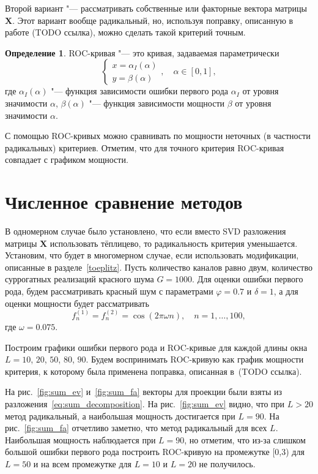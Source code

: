 \documentclass[specialist,
substylefile = spbu_report.rtx,
subf,href,colorlinks=true, 12pt]{disser}
\newcommand{\traj}{\mathbf{X}}
\theoremstyle{definition}
\newtheorem{definition}{Определение}
\begin{document}
	Второй вариант "--- рассматривать собственные или факторные вектора матрицы $\traj$. Этот вариант вообще радикальный, но, используя поправку, описанную в работе (TODO ссылка), можно сделать такой критерий точным.
	
	\begin{definition}
		ROC-кривая "--- это кривая, задаваемая параметрически
		\[
		\begin{cases}
		x=\alpha_I(\alpha)\\
		y=\beta(\alpha)
		\end{cases},\quad \alpha\in[0,1],
		\]
		где $\alpha_I(\alpha)$ "--- функция зависимости ошибки первого рода $\alpha_I$ от уровня значимости $\alpha$, $\beta(\alpha)$ "--- функция зависимости мощности $\beta$ от уровня значимости $\alpha$.
	\end{definition}
	С помощью ROC-кривых можно сравнивать по мощности неточных (в частности радикальных) критериев. Отметим, что для точного критерия ROC-кривая совпадает с графиком мощности.
	\section{Численное сравнение методов}
	В одномерном случае было установлено, что если вместо SVD разложения матрицы $\traj$ использовать тёплицево, то радикальность критерия уменьшается. Установим, что будет в многомерном случае, если использовать модификации, описанные в разделе~\ref{toeplitz}.
	Пусть количество каналов равно двум, количество суррогатных реализаций красного шума $G=1000$. Для оценки ошибки первого рода, будем рассматривать красный шум с параметрами $\varphi=0.7$ и $\delta=1$, а для оценки мощности будет рассматривать
	\[
	f_n^{(1)}=f_n^{(2)}=\cos(2\pi\omega n),\quad n=1,\ldots, 100,
	\]
	где $\omega=0.075$.
	
	Построим графики ошибки первого рода и ROC-кривые для каждой длины окна $L=10$, $20$, $50$, $80$, $90$. Будем воспринимать ROC-кривую как график мощности критерия, к которому была применена поправка, описанная в~(TODO ссылка). 
	
	На рис.~\ref{fig:sum_ev} и~\ref{fig:sum_fa} векторы для проекции были взяты из разложения~\eqref{eq:sum_decomposition}. На рис.~\ref{fig:sum_ev} видно, что при $L>20$ метод радикальный, а наибольшая мощность достигается при $L=90$. На рис.~\ref{fig:sum_fa} отчетливо заметно, что метод радикальный для всех $L$. Наибольшая мощность наблюдается при $L=90$, но отметим, что из-за слишком большой ошибки первого рода построить ROC-кривую на промежутке [0,3) для $L=50$ и на всем промежутке для $L=10$ и $L=20$ не получилось.
	
\end{document}
